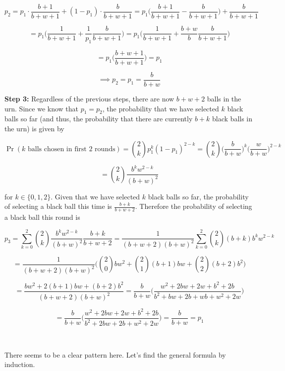 \[
p_2 = p_1 \cdot \frac{b + 1}{b + w + 1} + (1 - p_1) \cdot \frac{b}{b + w + 1} = p_1 \bigg(\frac{b + 1}{b + w + 1} -  \frac{b}{b + w + 1} \bigg) + \frac{b}{b + w + 1}
\]

\[
= p_1\bigg( \frac{1}{b + w + 1} + \frac{1}{p_1}\frac{b}{b + w + 1} \bigg) = p_1\bigg( \frac{1}{b + w + 1} + \frac{b + w}{b}\frac{b}{b + w + 1} \bigg) 
\]

\[
= p_1 \bigg(\frac{b + w + 1}{b + w + 1} \bigg) = p_1
\]



\[
\implies p_2 = p_1 =  \frac{b}{b+w}
\]

\textbf{Step 3:} Regardless of the previous steps, there are now \(b + w + 2\) balls in the urn. Since we know that \(p_1 = p_2\), the probability that we have selected \(k\) black balls so far (and thus, the probability that there are currently \(b + k\) black balls in the urn) is given by

\[
\Pr(k \text{ balls chosen in first 2 rounds}) = \binom{2}{k}p_1^k(1 - p_1)^{2 - k} = \binom{2}{k} \bigg(\frac{b}{b+w} \bigg)^k \bigg(\frac{w}{b+w} \bigg)^{2 - k}
\]

\[
= \binom{2}{k}\frac{b^k w^{2-k}}{(b+w)^2} 
\]

for \(k \in \{0, 1, 2\}\). Given that we have selected \(k\) black balls so far, the probability of selecting a black ball this time is \(\frac{b + k}{b + w + 2}\). Therefore the probability of selecting a black ball this round is

\[
p_3 = \sum_{k=0}^2 \binom{2}{k}\frac{b^k w^{2-k}}{(b+w)^2} \frac{b + k}{b + w + 2} = \frac{1}{(b+w+2)(b+w)^2} \sum_{k=0}^2 \binom{2}{k} (b+k)b^kw^{2-k}
\]

\[
= \frac{1}{(b+w+2)(b+w)^2} \bigg( \binom{2}{0}bw^2 + \binom{2}{1}(b+1)bw + \binom{2}{2}(b+2)b^2 \bigg)
\]

\[
= \frac{bw^2 + 2(b+1)bw + (b+2)b^2}{(b+w+2)(b+w)^2} = \frac{b}{b+w} \bigg(\frac{w^2 + 2bw + 2w + b^2 + 2b}{b^2 + bw + 2b + wb + w^2 + 2w}\bigg)
\]

\[
=\frac{b}{b+w} \bigg( \frac{w^2 + 2bw + 2w + b^2 + 2b}{b^2 + 2bw + 2b + w^2 + 2w} \bigg) = \frac{b}{b+w} = p_1
\]

\

There seems to be a clear pattern here. Let's find the general formula by induction.

